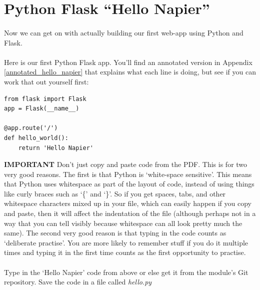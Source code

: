 \documentclass[12pt, a4paper, oneside]{book}
\begin{document}
\section{Python Flask ``Hello Napier''}
\label{hello-napier}

\paragraph{} Now we can get on with actually building our first web-app using Python and Flask.

\paragraph{} Here is our first Python Flask app. You'll find an annotated version in Appendix \ref{annotated_hello_napier} that explains what each line is doing, but see if you can work that out yourself first:

\begin{lstlisting}
from flask import Flask
app = Flask(__name__)

@app.route('/')
def hello_world():
    return 'Hello Napier'
\end{lstlisting}

\begin{framed}
\textbf{IMPORTANT} Don't just copy and paste code from the PDF. This is for two very good reasons. The first is that Python is `white-space sensitive'. This means that Python uses whitespace as part of the layout of code, instead of using things like curly braces such as `\{' and `\}'. So if you get spaces, tabs, and other whitespace characters mixed up in your file, which can easily happen if you copy and paste, then it will affect the indentation of the file (although perhaps not in a way that you can tell visibly because whitespace can all look pretty much the same). The second very good reason is that typing in the code counts as `deliberate practise'. You are more likely to remember stuff if you do it multiple times and typing it in the first time counts as the first opportunity to practise.
\end{framed}

\paragraph{} Type in the `Hello Napier' code from above or else get it from the module's Git repository. Save the code in a file called \emph{hello.py}

\end{document}
